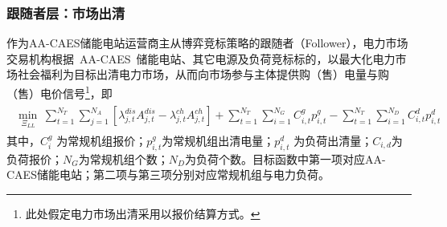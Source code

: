 \subsubsection{跟随者层：市场出清}
作为AA-CAES储能电站运营商主从博弈竞标策略的跟随者（Follower），电力市场交易机构根据~AA-CAES~储能电站、其它电源及负荷竞标标的，以最大化电力市场社会福利为目标出清电力市场\cite{CAES-DAM-Rui-18}，从而向市场参与主体提供购（售）电量与购（售）电价信号\footnote{此处假定电力市场出清采用以报价结算方式。}，即
\begin{eqnarray}
\label{equ:aa-caes-pab-follow-obj}
\begin{array}{l}
\mathop {\min \;}\limits_{{\Xi _{LL}}\;} \sum\limits_{t = 1}^{{N_T}} {\sum\limits_{j = 1}^{{N_A}} {\left[ {\lambda _{j,t}^{dis}A_{j,t}^{dis} - \lambda _{j,t}^{ch}A_{j,t}^{ch}} \right]} } + \sum\limits_{t = 1}^{{N_T}} {\sum\limits_{i = 1}^{{N_G}} {C_{i,t}^gp_{i,t}^g} }  - \sum\limits_{t = 1}^{{N_T}} {\sum\limits_{i = 1}^{{N_D}} {C_{i,t}^dp_{i,t}^d} }
\end{array}
\end{eqnarray}
其中，$C_i^g$ 为常规机组报价；$p_{i,t}^g$为常规机组出清电量；$p_{i,t}^d$ 为负荷出清量；$C_{i,d}$为负荷报价；$N_G$为常规机组个数；$N_D$为负荷个数。目标函数中第一项对应AA-CAES储能电站；第二项与第三项分别对应常规机组与电力负荷。

